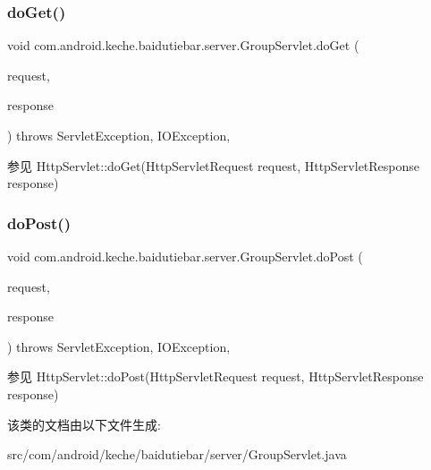 \subsubsection{\texorpdfstring{do\+Get()}{doGet()}}
{\footnotesize\ttfamily void com.\+android.\+keche.\+baidutiebar.\+server.\+Group\+Servlet.\+do\+Get (\begin{DoxyParamCaption}\item[{Http\+Servlet\+Request}]{request,  }\item[{Http\+Servlet\+Response}]{response }\end{DoxyParamCaption}) throws Servlet\+Exception, I\+O\+Exception\hspace{0.3cm}{\ttfamily [inline]}, {\ttfamily [protected]}}

\begin{DoxySeeAlso}{参见}
Http\+Servlet\+::do\+Get(\+Http\+Servlet\+Request request, Http\+Servlet\+Response response) 
\end{DoxySeeAlso}
\mbox{\label{classcom_1_1android_1_1keche_1_1baidutiebar_1_1server_1_1_group_servlet_aa9b08b4da3a8fde05198fa1e6aec01ca}} 
\subsubsection{\texorpdfstring{do\+Post()}{doPost()}}
{\footnotesize\ttfamily void com.\+android.\+keche.\+baidutiebar.\+server.\+Group\+Servlet.\+do\+Post (\begin{DoxyParamCaption}\item[{Http\+Servlet\+Request}]{request,  }\item[{Http\+Servlet\+Response}]{response }\end{DoxyParamCaption}) throws Servlet\+Exception, I\+O\+Exception\hspace{0.3cm}{\ttfamily [inline]}, {\ttfamily [protected]}}

\begin{DoxySeeAlso}{参见}
Http\+Servlet\+::do\+Post(\+Http\+Servlet\+Request request, Http\+Servlet\+Response response) 
\end{DoxySeeAlso}


该类的文档由以下文件生成\+:\begin{DoxyCompactItemize}
\item 
src/com/android/keche/baidutiebar/server/Group\+Servlet.\+java\end{DoxyCompactItemize}
